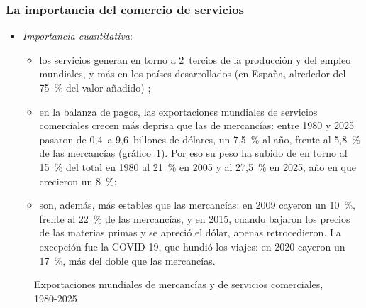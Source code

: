 \documentclass[11pt]{article}
\begin{document}
\subsubsection{La importancia del comercio de servicios}\label{sec:importancia-servicios}

\begin{itemize}
\item \emph{Importancia cuantitativa}:
  \begin{itemize}
  \item los servicios generan en torno a 2~tercios de la producción y del empleo mundiales, y más en los países desarrollados (en España, alrededor del 75~\% del valor añadido) ;
  \item en la balanza de pagos, las exportaciones mundiales de servicios comerciales crecen más deprisa que las de mercancías: entre 1980 y 2025 pasaron de 0,4~a 9,6~billones de dólares, un 7,5~\% al año, frente al 5,8~\% de las mercancías (gráfico~\ref{fig:bienes-servicios})\nocite{OMC2026EstadisticasMercancias,OMC2026EstadisticasServicios}. Por eso su peso ha subido de en torno al 15~\% del total en 1980 al 21~\% en 2005 y al 27,5~\% en 2025, año en que crecieron un 8~\%;
  \item son, además, más estables que las mercancías: en 2009 cayeron un 10~\%, frente al 22~\% de las mercancías, y en 2015, cuando bajaron los precios de las materias primas y se apreció el dólar, apenas retrocedieron. La excepción fue la COVID-19, que hundió los viajes: en 2020 cayeron un 17~\%, más del doble que las mercancías\nocite{OMC2026EstadisticasMercancias,OMC2026EstadisticasServicios}.
  \end{itemize}
\end{itemize}

\begin{figure}[H]
\centering
\caption{Exportaciones mundiales de mercancías y de servicios comerciales, 1980-2025}\label{fig:bienes-servicios}
\end{figure}
\end{document}

